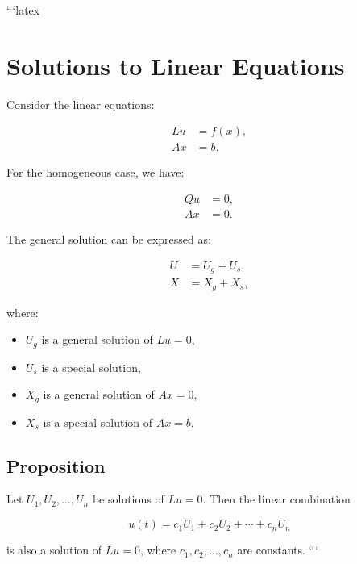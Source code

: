 ```latex
\section*{Solutions to Linear Equations}

Consider the linear equations:

\begin{align}
    Lu &= f(x), \\
    Ax &= b.
\end{align}

For the homogeneous case, we have:

\begin{align}
    Qu &= 0, \\
    Ax &= 0.
\end{align}

The general solution can be expressed as:

\begin{align}
    U &= U_g + U_s, \\
    X &= X_g + X_s,
\end{align}

where:
\begin{itemize}
    \item $U_g$ is a general solution of $Lu = 0$,
    \item $U_s$ is a special solution,
    \item $X_g$ is a general solution of $Ax = 0$,
    \item $X_s$ is a special solution of $Ax = b$.
\end{itemize}

\subsection*{Proposition}

Let $U_1, U_2, \ldots, U_n$ be solutions of $Lu = 0$. Then the linear combination

\begin{equation}
    u(t) = c_1 U_1 + c_2 U_2 + \cdots + c_n U_n
\end{equation}

is also a solution of $Lu = 0$, where $c_1, c_2, \ldots, c_n$ are constants.
```
